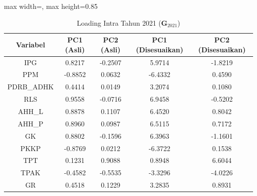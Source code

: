 \begin{table}[H]
\centering
\caption{Loading Intra Tahun 2021 ($\mathbf{G}_{2021}$)} \label{tab:app1loading_intra_2021}
\begin{adjustbox}{max width=\textwidth, max height=0.85\textheight}
\begin{tabular}{|c|c|c|c|c|}
\hline
\textbf{Variabel} & \textbf{PC1 (Asli)} & \textbf{PC2 (Asli)} & \textbf{PC1 (Disesuaikan)} & \textbf{PC2 (Disesuaikan)} \\
\hline
IPG & 0.8217 & -0.2507 & 5.9714 & -1.8219 \\
PPM & -0.8852 & 0.0632 & -6.4332 & 0.4590 \\
PDRB\_ADHK & 0.4414 & 0.0149 & 3.2074 & 0.1080 \\
RLS & 0.9558 & -0.0716 & 6.9458 & -0.5202 \\
AHH\_L & 0.8878 & 0.1107 & 6.4520 & 0.8042 \\
AHH\_P & 0.8960 & 0.0987 & 6.5115 & 0.7172 \\
GK & 0.8802 & -0.1596 & 6.3963 & -1.1601 \\
PKKP & -0.8769 & 0.0212 & -6.3722 & 0.1538 \\
TPT & 0.1231 & 0.9088 & 0.8948 & 6.6044 \\
TPAK & -0.4582 & -0.5535 & -3.3296 & -4.0226 \\
GR & 0.4518 & 0.1229 & 3.2835 & 0.8931 \\
\hline
\end{tabular}
\end{adjustbox}
\end{table}